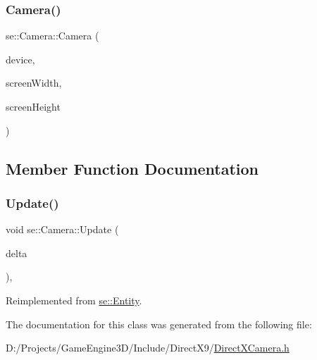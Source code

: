 \subsubsection{\texorpdfstring{Camera()}{Camera()}}
{\footnotesize\ttfamily se\+::\+Camera\+::\+Camera (\begin{DoxyParamCaption}\item[{L\+P\+D\+I\+R\+E\+C\+T3\+D\+D\+E\+V\+I\+C\+E9}]{device,  }\item[{int}]{screen\+Width,  }\item[{int}]{screen\+Height }\end{DoxyParamCaption})}



\subsection{Member Function Documentation}
\mbox{\label{classse_1_1_camera_abecf2d50dc793707a475b35bb487812c}} 
\subsubsection{\texorpdfstring{Update()}{Update()}}
{\footnotesize\ttfamily void se\+::\+Camera\+::\+Update (\begin{DoxyParamCaption}\item[{float}]{delta }\end{DoxyParamCaption})\hspace{0.3cm}{\ttfamily [override]}, {\ttfamily [virtual]}}



Reimplemented from \mbox{\hyperlink{classse_1_1_entity_a1cd277c4c5a517f5cde8b72d5c40a8f0}{se\+::\+Entity}}.



The documentation for this class was generated from the following file\+:\begin{DoxyCompactItemize}
\item 
D\+:/\+Projects/\+Game\+Engine3\+D/\+Include/\+Direct\+X9/\mbox{\hyperlink{_direct_x_camera_8h}{Direct\+X\+Camera.\+h}}\end{DoxyCompactItemize}
